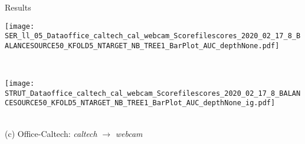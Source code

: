 \begin{frame}{Results}
\begin{minipage}[t]{0.33\linewidth}
        \end{minipage}\hfill
        \begin{minipage}[t]{0.329\linewidth}\vspace{0pt}
            \centering
            \begin{minipage}[t]{\ratio\linewidth}\vspace{0pt}
            \centerline{\texttt{[image: SER\_ll\_05\_Dataoffice\_caltech\_cal\_webcam\_Scorefilescores\_2020\_02\_17\_8\_BALANCESOURCE50\_KFOLD5\_NTARGET\_NB\_TREE1\_BarPlot\_AUC\_depthNone.pdf]}}
            \end{minipage}\\
            \begin{minipage}[t]{\ratio\linewidth}\vspace{0cm}
            \centerline{\texttt{[image: STRUT\_Dataoffice\_caltech\_cal\_webcam\_Scorefilescores\_2020\_02\_17\_8\_BALANCESOURCE50\_KFOLD5\_NTARGET\_NB\_TREE1\_BarPlot\_AUC\_depthNone\_ig.pdf]}}
            \end{minipage}\\
            \medskip
            {\small(c)\; Office-Caltech: \emph{caltech} $\rightarrow$ \emph{webcam}}
        \end{minipage}
    
\end{frame}


